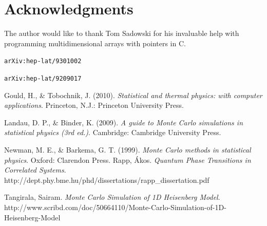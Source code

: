 \documentclass[a4paper,12pt]{article}
\begin{document}
\section{Acknowledgments}
The author would like to thank Tom Sadowski for his invaluable help with programming multidimensional arrays with pointers in C.


\begin{thebibliography}{9}
  
  {\tt arXiv:hep-lat/9301002}
  
  {\tt arXiv:hep-lat/9209017}
  
  Gould, H., \& Tobochnik, J. (2010).
  \emph{Statistical and thermal physics: with computer applications}.
  Princeton, N.J.: Princeton University Press.
  

  Landau, D. P., \& Binder, K. (2009).
  \emph{A guide to Monte Carlo simulations in statistical physics (3rd ed.)}.
  Cambridge: Cambridge University Press.
  
  Newman, M. E., \& Barkema, G. T. (1999).
  \emph{Monte Carlo methods in statistical physics}.
  Oxford: Clarendon Press.
  Rapp, \'Akos.
  \emph{Quantum Phase Transitions in Correlated Systems}.
  http://dept.phy.bme.hu/phd/dissertations/rapp\_dissertation.pdf
  
  Tangirala, Sairam.
  \emph{Monte Carlo Simulation of 1D Heisenberg Model}.
  http://www.scribd.com/doc/50664110/Monte-Carlo-Simulation-of-1D-Heisenberg-Model
  

\end{thebibliography}
\end{document}
